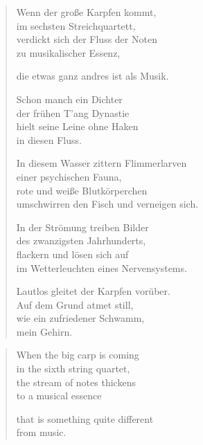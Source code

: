 
{\setlength{\stanzaskip}{0.6em}

\cleartoverso


\vspace*{-0.3em}
\begin{verse}

Wenn der große Karpfen kommt,\\
im sechsten Streichquartett,\\
verdickt sich der Fluss der Noten\\
zu musikalischer Essenz,

die etwas ganz andres ist als Musik.

Schon manch ein Dichter\\
der frühen T'ang Dynastie\\
hielt seine Leine ohne Haken\\
in diesen Fluss.

In diesem Wasser zittern Flimmerlarven\\
einer psychischen Fauna,\\
rote und weiße Blutkörperchen\\
umschwirren den Fisch und verneigen sich.

In der Strömung treiben Bilder\\
des zwanzigsten Jahrhunderts,\\
flackern und lösen sich auf\\
im Wetterleuchten eines Nervensystems.

Lautlos gleitet der Karpfen vorüber.\\
Auf dem Grund atmet still,\\
wie ein zufriedener Schwamm,\\
mein Gehirn.

\end{verse}

\clearpage


\vspace*{-0.3em}
\begin{verse}

When the big carp is coming\\
in the sixth string quartet,\\
the stream of notes thickens\\
to a musical essence

that is something quite different\\
from music.


\end{verse}}

